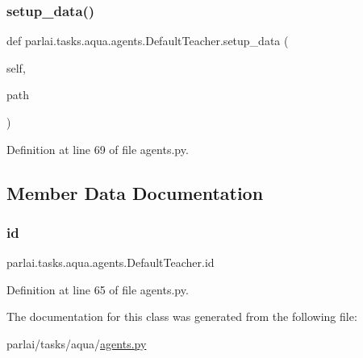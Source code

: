\subsubsection{\texorpdfstring{setup\+\_\+data()}{setup\_data()}}
{\footnotesize\ttfamily def parlai.\+tasks.\+aqua.\+agents.\+Default\+Teacher.\+setup\+\_\+data (\begin{DoxyParamCaption}\item[{}]{self,  }\item[{}]{path }\end{DoxyParamCaption})}



Definition at line 69 of file agents.\+py.



\subsection{Member Data Documentation}
\mbox{\label{classparlai_1_1tasks_1_1aqua_1_1agents_1_1DefaultTeacher_a7f24ae016e64a6b1b6c091598b204897}} 
\subsubsection{\texorpdfstring{id}{id}}
{\footnotesize\ttfamily parlai.\+tasks.\+aqua.\+agents.\+Default\+Teacher.\+id}



Definition at line 65 of file agents.\+py.



The documentation for this class was generated from the following file\+:\begin{DoxyCompactItemize}
\item 
parlai/tasks/aqua/\hyperlink{parlai_2tasks_2aqua_2agents_8py}{agents.\+py}\end{DoxyCompactItemize}
